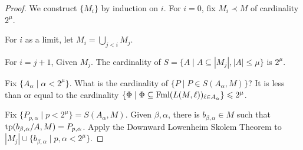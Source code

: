 \documentclass{report}
\begin{document}
\begin{proof}
    We construct $\{M_i\}$ by induction on $i$. For $i = 0$, fix $M_i \prec M$ of cardinality $2^\mu$. 

    For $i$ as a limit, let $M_i = \bigcup_{j < i} M_j$. 

    For $i = j+1$, Given $M_j$. The cardinality of $S = \{A \mid A \subseteq |M_j| , |A| \leq \mu \}$ is $2^\mu$.

    Fix $\{A_\alpha \mid \alpha < 2^\mu\}$. What is the cardinality of $\{P \mid P \in S(A_\alpha, M) \}$? It is less than or equal to the cardinality $\{ \Phi \mid \Phi \subseteq \text{Fml}(L(M, \ell))_{\ell \in A_\alpha} \} \leqslant 2^\mu$.

    Fix $\{P_{p, \alpha} \mid p < 2^\mu\} = S(A_{\alpha}, M)$. Given $\beta, \alpha$, there is $b_{\beta, \alpha} \in M$ such that $\text{tp}(b_{\beta, \alpha} / A, M) = P_{p, \alpha}$. Apply the Downward Lowenheim Skolem Theorem to $|M_j| \cup \{b_{\beta, \alpha} \mid p, \alpha < 2^\mu\}$.

    
\end{proof}
\end{document}
